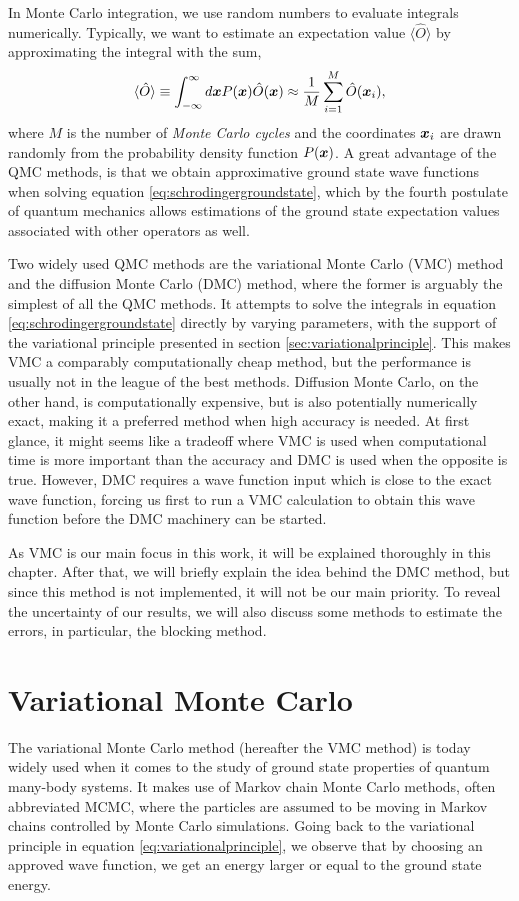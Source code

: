 In Monte Carlo integration, we use random numbers to evaluate integrals numerically. Typically, we want to estimate an expectation value $\langle\hat{O}\rangle$ by approximating the integral with the sum,
\begin{equation}
\langle \hat{O}\rangle\equiv\int_{-\infty}^{\infty}d\boldsymbol{{x}}P(\boldsymbol{{x}})\hat{O}(\boldsymbol{{x}})\approx\frac{1}{M}\sum_{i=1}^M\hat{O}(\boldsymbol{{x}}_i),
\label{eq:montecarlointegration}
\end{equation}
where $M$ is the number of \textit{Monte Carlo cycles} and the coordinates $\boldsymbol{{x}}_i$ are drawn randomly from the probability density function $P(\boldsymbol{{x}})$. A great advantage of the QMC methods, is that we obtain approximative ground state wave functions when solving equation \eqref{eq:schrodingergroundstate}, which by the fourth postulate of quantum mechanics allows estimations of the ground state expectation values associated with other operators as well. 

Two widely used QMC methods are the variational Monte Carlo (VMC) method and the diffusion Monte Carlo (DMC) method, where the former is arguably the simplest of all the QMC methods. It attempts to solve the integrals in equation \eqref{eq:schrodingergroundstate} directly by varying parameters, with the support of the variational principle presented in section \ref{sec:variationalprinciple}. This makes VMC a comparably computationally cheap method, but the performance is usually not in the league of the best methods. Diffusion Monte Carlo, on the other hand, is computationally expensive, but is also potentially numerically exact, making it a preferred method when high accuracy is needed. At first glance, it might seems like a tradeoff where VMC is used when computational time is more important than the accuracy and DMC is used when the opposite is true. However, DMC requires a wave function input which is close to the exact wave function, forcing us first to run a VMC calculation to obtain this wave function before the DMC machinery can be started.

As VMC is our main focus in this work, it will be explained thoroughly in this chapter. After that, we will briefly explain the idea behind the DMC method, but since this method is not implemented, it will not be our main priority. To reveal the uncertainty of our results, we will also discuss some methods to estimate the errors, in particular, the blocking method.

\section{Variational Monte Carlo} \label{sec:vmc}
The variational Monte Carlo method (hereafter the VMC method) is today widely used when it comes to the study of ground state properties of quantum many-body systems. It makes use of Markov chain Monte Carlo methods, often abbreviated MCMC, where the particles are assumed to be moving in Markov chains controlled by Monte Carlo simulations. Going back to the variational principle in equation \eqref{eq:variationalprinciple}, we observe that by choosing an approved wave function, we get an energy larger or equal to the ground state energy.

